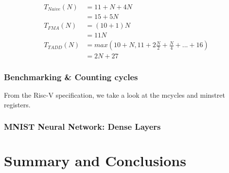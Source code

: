 \documentclass[a4paper,9pt]{report}
\begin{document}

\begin{align*}
  T_{Naive}(N) &= 11+N + 4N \\
  &= 15 + 5N \\
  T_{FMA}(N) &= (10+1)N \\
             &= 11N \\
  T_{TADD}(N) &= max(10+N, 11+2\frac{N}{2} + \frac{N}{4} + ... + 16) \\
             &= 2N+27 
\end{align*}


\subsection{Benchmarking \& Counting cycles}
From the Risc-V specification, we take a look at the mcycles and minstret
registers.

\subsection{MNIST Neural Network: Dense Layers}

\chapter{Summary and Conclusions} 


\appendix
\singlespacing

 
% 
\end{document}

